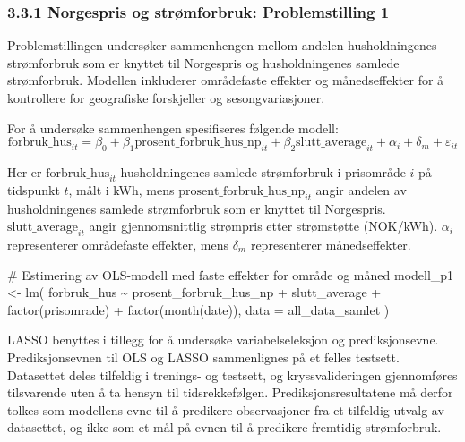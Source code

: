 \documentclass[
  letterpaper,
  DIV=11,
  numbers=noendperiod]{scrartcl}
\newenvironment{Shaded}{\begin{snugshade}}{\end{snugshade}}
\newcommand{\AttributeTok}[1]{\textcolor[rgb]{0.40,0.45,0.13}{#1}}
\newcommand{\CommentTok}[1]{\textcolor[rgb]{0.37,0.37,0.37}{#1}}
\newcommand{\FunctionTok}[1]{\textcolor[rgb]{0.28,0.35,0.67}{#1}}
\newcommand{\NormalTok}[1]{\textcolor[rgb]{0.00,0.23,0.31}{#1}}
\newcommand{\OtherTok}[1]{\textcolor[rgb]{0.00,0.23,0.31}{#1}}
\newcommand{\SpecialCharTok}[1]{\textcolor[rgb]{0.37,0.37,0.37}{#1}}
\begin{document}
\subsubsection{3.3.1 Norgespris og strømforbruk: Problemstilling
1}\label{norgespris-og-struxf8mforbruk-problemstilling-1}

Problemstillingen undersøker sammenhengen mellom andelen husholdningenes
strømforbruk som er knyttet til Norgespris og husholdningenes samlede
strømforbruk. Modellen inkluderer områdefaste effekter og månedseffekter
for å kontrollere for geografiske forskjeller og sesongvariasjoner.

For å undersøke sammenhengen spesifiseres følgende modell: \[
\text{forbruk\_hus}_{it}
= \beta_0
+ \beta_1 \text{prosent\_forbruk\_hus\_np}_{it}
+ \beta_2 \text{slutt\_average}_{it}
+ \alpha_i
+ \delta_m
+ \varepsilon_{it}
\]

Her er \(\text{forbruk\_hus}_{it}\) husholdningenes samlede strømforbruk
i prisområde \(i\) på tidspunkt \(t\), målt i kWh, mens
\(\text{prosent\_forbruk\_hus\_np}_{it}\) angir andelen av
husholdningenes samlede strømforbruk som er knyttet til Norgespris.
\(\text{slutt\_average}_{it}\) angir gjennomsnittlig strømpris etter
strømstøtte (NOK/kWh). \(\alpha_i\) representerer områdefaste effekter,
mens \(\delta_m\) representerer månedseffekter.

\begin{Shaded}
\begin{Highlighting}[]
\CommentTok{\# Estimering av OLS{-}modell med faste effekter for område og måned}
\NormalTok{modell\_p1 }\OtherTok{\textless{}{-}} \FunctionTok{lm}\NormalTok{(}
\NormalTok{  forbruk\_hus }\SpecialCharTok{\textasciitilde{}}\NormalTok{ prosent\_forbruk\_hus\_np }\SpecialCharTok{+}
\NormalTok{    slutt\_average }\SpecialCharTok{+}
    \FunctionTok{factor}\NormalTok{(prisomrade) }\SpecialCharTok{+}
    \FunctionTok{factor}\NormalTok{(}\FunctionTok{month}\NormalTok{(date)),}
  \AttributeTok{data =}\NormalTok{ all\_data\_samlet}
\NormalTok{)}
\end{Highlighting}
\end{Shaded}

LASSO benyttes i tillegg for å undersøke variabelseleksjon og
prediksjonsevne. Prediksjonsevnen til OLS og LASSO sammenlignes på et
felles testsett. Datasettet deles tilfeldig i trenings- og testsett, og
kryssvalideringen gjennomføres tilsvarende uten å ta hensyn til
tidsrekkefølgen. Prediksjonsresultatene må derfor tolkes som modellens
evne til å predikere observasjoner fra et tilfeldig utvalg av
datasettet, og ikke som et mål på evnen til å predikere fremtidig
strømforbruk.
\end{document}
